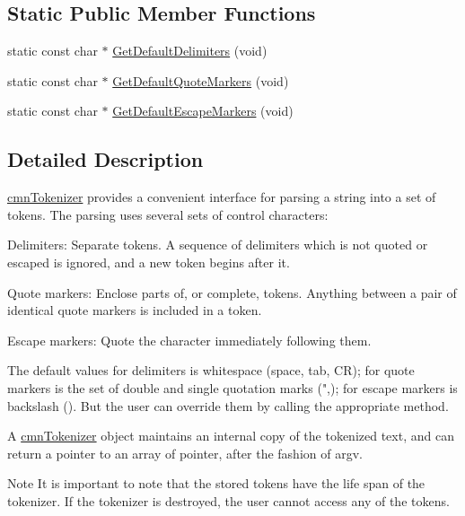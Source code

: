 \subsection*{Static Public Member Functions}
\begin{DoxyCompactItemize}
\item 
static const char $\ast$ \hyperlink{classcmn_tokenizer_aecd698f78bea30e2aa945378510080d9}{Get\+Default\+Delimiters} (void)
\item 
static const char $\ast$ \hyperlink{classcmn_tokenizer_af5f444c9daae22083ecbbd28c3646425}{Get\+Default\+Quote\+Markers} (void)
\item 
static const char $\ast$ \hyperlink{classcmn_tokenizer_aa9bdfbc4257afa5cab0793bb56823378}{Get\+Default\+Escape\+Markers} (void)
\end{DoxyCompactItemize}


\subsection{Detailed Description}
\hyperlink{classcmn_tokenizer}{cmn\+Tokenizer} provides a convenient interface for parsing a string into a set of tokens. The parsing uses several sets of control characters\+:

Delimiters\+: Separate tokens. A sequence of delimiters which is not quoted or escaped is ignored, and a new token begins after it.

Quote markers\+: Enclose parts of, or complete, tokens. Anything between a pair of identical quote markers is included in a token.

Escape markers\+: Quote the character immediately following them.

The default values for delimiters is whitespace (space, tab, C\+R); for quote markers is the set of double and single quotation marks (",\textquotesingle{}); for escape markers is backslash (). But the user can override them by calling the appropriate method.

A \hyperlink{classcmn_tokenizer}{cmn\+Tokenizer} object maintains an internal copy of the tokenized text, and can return a pointer to an array of pointer, after the fashion of argv.

\begin{DoxyNote}{Note}
It is important to note that the stored tokens have the life span of the tokenizer. If the tokenizer is destroyed, the user cannot access any of the tokens. 
\end{DoxyNote}


